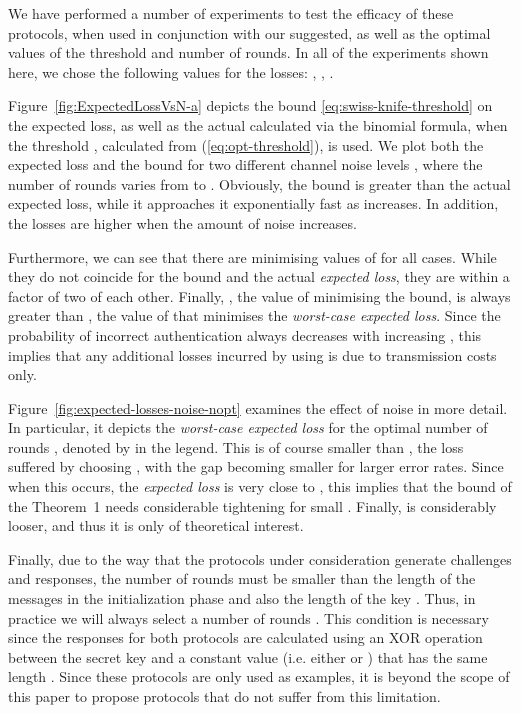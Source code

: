 \documentclass[a4paper]{article}
\theoremstyle{plain} \newtheorem{remark}{Remark}
\theoremstyle{plain} \newtheorem{definition}{Definition}
\theoremstyle{plain} \newtheorem{example}{Example}
\theoremstyle{plain} \newtheorem{assumption}{Assumption}
\theoremstyle{plain} \newtheorem{conjecture}{Conjecture}
\theoremstyle{plain} \newtheorem{theorem}{Theorem}
\theoremstyle{plain} \newtheorem{proposition}{Proposition}
\theoremstyle{plain} \newtheorem{lemma}{Lemma}
\theoremstyle{plain} \newtheorem{corollary}{Corollary}
\begin{document}
We have performed a number of experiments to test the efficacy of
these protocols, when used in conjunction with our suggested, as well
as the optimal values of the threshold and number of rounds.  In all
of the experiments shown here, we chose the following values for the
losses: , , .  

Figure~\ref{fig:ExpectedLossVsN-a} depicts the bound
\eqref{eq:swiss-knife-threshold} on the expected loss, as well as the
actual  calculated via the binomial formula, when the
threshold , calculated from (\ref{eq:opt-threshold}), is used.
We plot both the expected loss and the bound for two different channel
noise levels , where the number of
rounds  varies from  to . Obviously, the bound is greater
than the actual expected loss, while it approaches it exponentially
fast as  increases.  In addition, the losses are higher when the
amount of noise increases.

Furthermore, we can see that there are minimising values of  for
all cases. While they do not coincide for the bound and the actual
\textit{expected loss}, they are within a factor of two of each
other. Finally, , the value of  minimising the bound, is
always greater than , the value of  that minimises the {\em
  worst-case expected loss}.  Since the probability of incorrect
authentication always decreases with increasing , this implies that
any additional losses incurred by using  is due to transmission
costs only.

Figure~\ref{fig:expected-losses-noise-nopt}
examines the effect of noise in more detail.  In particular,
it depicts the \textit{worst-case expected loss} for the optimal number of
rounds , denoted by  in the legend.  This is
of course smaller than , the loss suffered by
choosing , with the gap becoming smaller for larger error
rates. Since when this occurs, the \textit{expected loss} is very close to
, this implies that the bound of the Theorem~1 needs considerable
tightening for small . Finally,  is considerably
looser, and thus it is only of theoretical interest.


Finally, due to the way that the protocols under consideration
generate challenges and responses, the number of rounds  must be
smaller than the length  of the messages in the initialization
phase and also the length of the key .  Thus, in practice we will
always select a number of rounds .  This
condition is necessary since the responses  for both protocols are
calculated using an XOR operation between the secret key  and a
constant value (i.e. either  or ) that has the same
length . Since these protocols are only used as examples, it is
beyond the scope of this paper to propose protocols that do not suffer
from this limitation.
\end{document}
